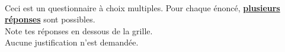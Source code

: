 \documentclass[a4paper,11pt]{article}
\begin{document}
\begin{exercice}[(4 points)] \

	\begin{attention}
		Ceci est un questionnaire à choix multiples. Pour chaque énoncé, \textbf{\uline{plusieurs}} \textbf{\uline{réponses}} sont possibles. \\[0.5em]
		Note tes réponses en dessous de la grille. \\[0.5em]
		Aucune justification n'est demandée.

		\begin{other_exemple}
		\end{other_exemple}
	\end{attention}


\end{exercice}
\end{document}
